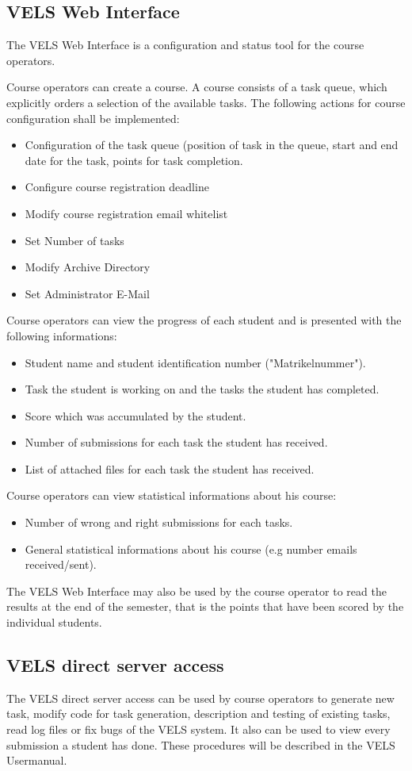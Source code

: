 \subsection{VELS Web Interface}\label{webinterface}

The VELS Web Interface is a configuration and status tool for the course operators.

Course operators can create a course. A course consists of a task queue, which explicitly orders a 
selection of the available tasks. The following actions for course configuration shall be implemented:
\begin{itemize}
\item Configuration of the task queue (position of task in the queue, start and end date for the task,
    points for task completion.
\item Configure course registration deadline
\item Modify course registration email whitelist 
\item Set Number of tasks 
\item Modify Archive Directory
\item Set Administrator E-Mail
\end{itemize}

Course operators can view the progress of each student and is presented with the following informations:
\begin{itemize}
\item Student name and student identification number ("Matrikelnummer").
\item Task the student is working on and the tasks the student has completed.
\item Score which was accumulated by the student.
\item Number of submissions for each task the student has received.
\item List of attached files for each task the student has received.
\end{itemize}

Course operators can view statistical informations about his course:
\begin{itemize}
\item Number of wrong and right submissions for each tasks.
\item General statistical informations about his course (e.g number emails received/sent).
\end{itemize}

The VELS Web Interface may also be used by the course operator to read the results at the end of the semester,
that is the points that have been scored by the individual students.


\subsection{VELS direct server access}\label{directserveraccess}
The VELS direct server access can be used by course operators to generate new task, modify code for task
generation, description and testing of existing tasks, read log files or fix bugs of the VELS system. 
It also can be used to view every submission a student has done. These procedures will be described in 
the VELS Usermanual.
